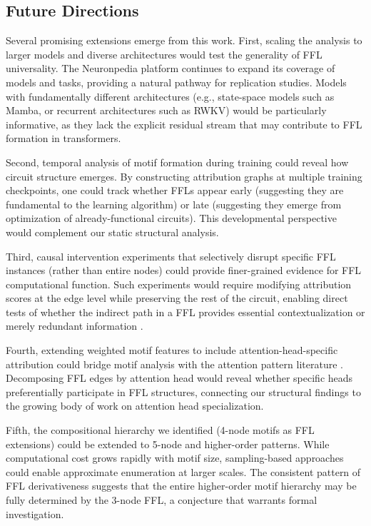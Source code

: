 \subsection{Future Directions}
Several promising extensions emerge from this work. First, scaling the analysis to larger models and diverse architectures would test the generality of FFL universality. The Neuronpedia platform continues to expand its coverage of models and tasks, providing a natural pathway for replication studies. Models with fundamentally different architectures (e.g., state-space models such as Mamba, or recurrent architectures such as RWKV) would be particularly informative, as they lack the explicit residual stream that may contribute to FFL formation in transformers.

Second, temporal analysis of motif formation during training could reveal how circuit structure emerges. By constructing attribution graphs at multiple training checkpoints, one could track whether FFLs appear early (suggesting they are fundamental to the learning algorithm) or late (suggesting they emerge from optimization of already-functional circuits). This developmental perspective would complement our static structural analysis.

Third, causal intervention experiments that selectively disrupt specific FFL instances (rather than entire nodes) could provide finer-grained evidence for FFL computational function. Such experiments would require modifying attribution scores at the edge level while preserving the rest of the circuit, enabling direct tests of whether the indirect path in a FFL provides essential contextualization or merely redundant information \cite{conmy2023automated}.

Fourth, extending weighted motif features to include attention-head-specific attribution could bridge motif analysis with the attention pattern literature \cite{olsson2022context, voita2019analyzing}. Decomposing FFL edges by attention head would reveal whether specific heads preferentially participate in FFL structures, connecting our structural findings to the growing body of work on attention head specialization.

Fifth, the compositional hierarchy we identified (4-node motifs as FFL extensions) could be extended to 5-node and higher-order patterns. While computational cost grows rapidly with motif size, sampling-based approaches \cite{benson2016higher} could enable approximate enumeration at larger scales. The consistent pattern of FFL derivativeness suggests that the entire higher-order motif hierarchy may be fully determined by the 3-node FFL, a conjecture that warrants formal investigation.